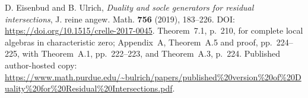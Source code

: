 D. Eisenbud and B. Ulrich,
\emph{Duality and socle generators for residual intersections},
J. reine angew. Math. \textbf{756} (2019), 183--226.
DOI: \url{https://doi.org/10.1515/crelle-2017-0045}.
Theorem~7.1, p.~210, for complete local algebras in characteristic zero;
Appendix~A, Theorem~A.5 and proof, pp.~224--225, with Theorem~A.1,
pp.~222--223, and Theorem~A.3, p.~224.
Published author-hosted copy:
\url{https://www.math.purdue.edu/~bulrich/papers/published%20version%20of%20Duality%20for%20Residual%20Intersections.pdf}.
